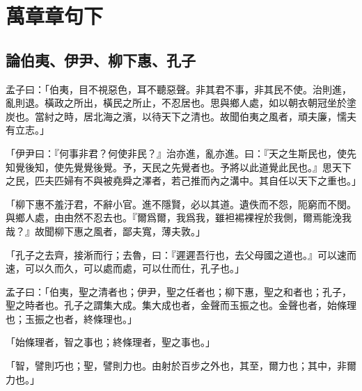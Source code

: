 \chapter{萬章章句下}
\kaishi*

\section{論伯夷、伊尹、柳下惠、孔子}

孟子曰：「伯夷，目不視惡色，耳不聽惡聲。非其君不事，非其民不使。治則進，亂則退。橫政之所出，橫民之所止，不忍居也。思與鄉人處，如以朝衣朝冠坐於塗炭也。當紂之時，居北海之濱，以待天下之清也。故聞伯夷之風者，頑夫廉，懦夫有立志。」

「伊尹曰：『何事非君？何使非民？』治亦進，亂亦進。曰：『天之生斯民也，使先知覺後知，使先覺覺後覺。予，天民之先覺者也。予將以此道覺此民也。』思天下之民，匹夫匹婦有不與被堯舜之澤者，若己推而內之溝中。其自任以天下之重也。」

「柳下惠不羞汙君，不辭小官。進不隱賢，必以其道。遺佚而不怨，阨窮而不閔。與鄉人處，由由然不忍去也。『爾爲爾，我爲我，雖袒裼裸裎於我側，爾焉能浼我哉？』故聞柳下惠之風者，鄙夫寬，薄夫敦。」

「孔子之去齊，接淅而行；去魯，曰：『遲遲吾行也，去父母國之道也。』可以速而速，可以久而久，可以處而處，可以仕而仕，孔子也。」

孟子曰：「伯夷，聖之清者也；伊尹，聖之任者也；柳下惠，聖之和者也；孔子，聖之時者也。孔子之謂集大成。集大成也者，金聲而玉振之也。金聲也者，始條理也；玉振之也者，終條理也。」

「始條理者，智之事也；終條理者，聖之事也。」

「智，譬則巧也；聖，譬則力也。由射於百步之外也，其至，爾力也；其中，非爾力也。」\par {}

